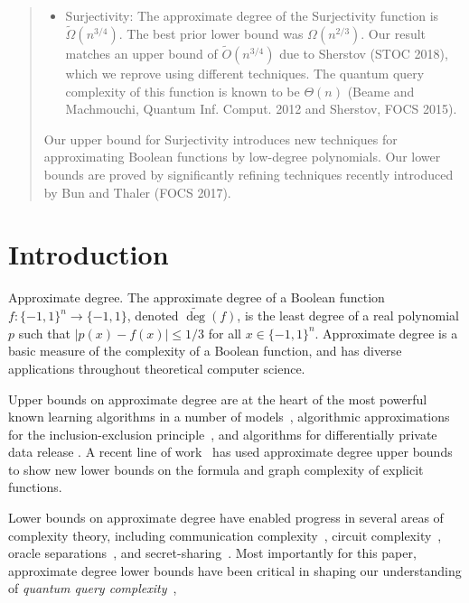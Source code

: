\documentclass[11pt, letterpaper, fleqn]{article}
\makeatletter
\newcommand{\para}{
  \@startsection{paragraph}{4}
  {\z@}{2ex \@plus 3.3ex \@minus .2ex}{-1em}
  {\normalfont\normalsize\bfseries}
}
\theoremstyle{plain}
\newcommand{\bits}{\{-1,1\}}
\newcommand{\adeg}{\widetilde{\operatorname{deg}}}
\makeatother
\begin{document}
\begin{abstract}
\begin{itemize}
\item Surjectivity: The approximate degree of the Surjectivity function is $\tilde{\Omega}(n^{3/4})$. The best prior lower bound was $\Omega(n^{2/3})$. Our result matches an upper bound of $\tilde{O}(n^{3/4})$ due to Sherstov (STOC 2018), which we reprove using different techniques. The quantum query complexity of this function is known to be $\Theta(n)$ (Beame and Machmouchi, Quantum Inf. Comput. 2012 and Sherstov, FOCS 2015). 



\end{itemize}

Our upper bound for Surjectivity introduces new techniques for approximating Boolean
functions by low-degree polynomials. Our lower bounds are proved by significantly refining techniques recently introduced by Bun and Thaler (FOCS 2017). 
\end{abstract}


\newpage 

\setcounter{tocdepth}{2}
\setlength{\cftbeforesecskip}{0.55em}
\tableofcontents

\newpage 
\section{Introduction}
\para{Approximate degree.}
The approximate degree of a Boolean function $f \colon \{-1, 1\}^n \to \{-1, 1\}$, denoted $\adeg(f)$, is the least degree of a real polynomial $p$ such that $|p(x)-f(x)| \leq 1/3$ for all $x \in \bits^n$. Approximate degree is a basic measure of the complexity of a Boolean function,
and has diverse applications throughout theoretical computer science.

Upper bounds on approximate degree are at the heart of the most powerful known learning
algorithms in a number of models~\cite{ksdnf, klivansservedioomb, kkms, servediotanthaler,
readonceformulae, colt, osnewbounds}, algorithmic approximations for the inclusion-exclusion principle~\cite{kahn,sherstovinclusion}, and algorithms for differentially private data release
\cite{difpriv1, difpriv2}. 
A recent line of work~\cite{tal2, tal1} has used approximate degree upper bounds to show new lower bounds on the formula and graph complexity of explicit functions.

Lower bounds on approximate degree
have enabled progress in several areas of complexity theory, including communication complexity~\cite{patmat, bvdw, comm1, comm2, comm3, comm4, comm6, comm7, comm8, sherstovsurvey}, circuit complexity~\cite{mp, sherstovmajmaj},
oracle separations~\cite{beigel, bchtv}, and secret-sharing~\cite{viola}. Most importantly for this paper, approximate degree lower bounds have been critical in shaping our understanding of \emph{quantum query complexity}~\cite{beals, qqc2, aaronsonshi}, 
\end{document}
